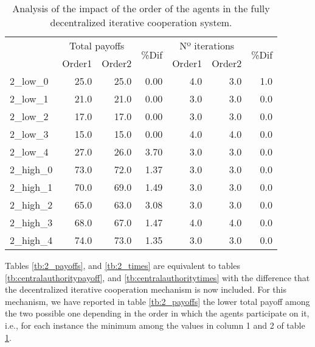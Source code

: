 \documentclass{article}
\begin{document}
\begin{table}[ht!]
\centering
\caption{Analysis of the impact of the order of the agents in the fully decentralized iterative cooperation system. \label{tb:iter_order_comparition}}
\begin{adjustbox}{max width=\textwidth}
\begin{tabular}{lrrrrrr}
\toprule
{} & \multicolumn{2}{c}{Total payoffs} & \multirow{2}{*}{\%Dif} & \multicolumn{2}{c}{Nº iterations} & \multirow{2}{*}{\%Dif} \\
{} &  Order1 &  Order2 &       &  Order1 &  Order2 & \\
\midrule
2\_low\_0  &           25.0 &           25.0 &  0.00 &        4.0 &        3.0 &     1.0 \\
2\_low\_1  &           21.0 &           21.0 &  0.00 &        3.0 &        3.0 &     0.0 \\
2\_low\_2  &           17.0 &           17.0 &  0.00 &        3.0 &        3.0 &     0.0 \\
2\_low\_3  &           15.0 &           15.0 &  0.00 &        4.0 &        4.0 &     0.0 \\
2\_low\_4  &           27.0 &           26.0 &  3.70 &        3.0 &        3.0 &     0.0 \\
2\_high\_0 &           73.0 &           72.0 &  1.37 &        3.0 &        3.0 &     0.0 \\
2\_high\_1 &           70.0 &           69.0 &  1.49 &        3.0 &        3.0 &     0.0 \\
2\_high\_2 &           65.0 &           63.0 &  3.08 &        3.0 &        3.0 &     0.0 \\
2\_high\_3 &           68.0 &           67.0 &  1.47 &        4.0 &        4.0 &     0.0 \\
2\_high\_4 &           74.0 &           73.0 &  1.35 &        3.0 &        3.0 &     0.0 \\
\bottomrule
\end{tabular}
\end{adjustbox}
\end{table}


Tables \ref{tb:2_payoffs}, and \ref{tb:2_times} are equivalent to tables \ref{tb:centralauthoritypayoff}, and \ref{tb:centralauthoritytimes} with the difference that the decentralized iterative cooperation mechanism is now included. For this mechanism, we have reported in table \ref{tb:2_payoffs} the lower total payoff among the two possible one depending in the order in which the agents participate on it, i.e., for each instance the minimum among the values in column 1 and 2 of table \ref{tb:iter_order_comparition}.
\end{document}
